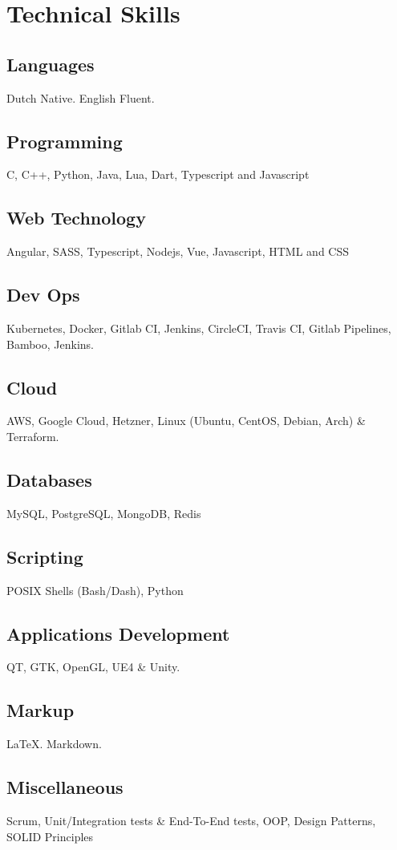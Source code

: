 \section{Technical Ski\textcolor{mycolor}{lls}}
  \subsection{Languages} 
  Dutch \textcolor{mycolor}{Native}. English \textcolor{mycolor}{Fluent}.
  \subsection{Programming}
    C, C++, Python, Java, Lua, Dart, Typescript and Javascript
  \subsection{Web Technology}
    Angular, SASS, Typescript, Nodejs, Vue, Javascript, HTML and CSS
  \subsection{Dev Ops}
    Kubernetes, Docker, Gitlab CI, Jenkins, CircleCI, Travis CI, Gitlab Pipelines, Bamboo, Jenkins.
  \subsection{Cloud}
    AWS, Google Cloud, Hetzner, Linux (Ubuntu, CentOS, Debian, Arch) \& Terraform.
  \subsection{Databases}
    MySQL, PostgreSQL, MongoDB, Redis
  \subsection{Scripting}
    POSIX Shells (Bash/Dash), Python
  \subsection{Applications Development}
    QT, GTK, OpenGL, UE4 \& Unity.
  \subsection{Markup}
    {\LaTeX}. Markdown.
  \subsection{Miscellaneous}
    Scrum, Unit/Integration tests \& End-To-End tests, OOP, Design Patterns, SOLID Principles